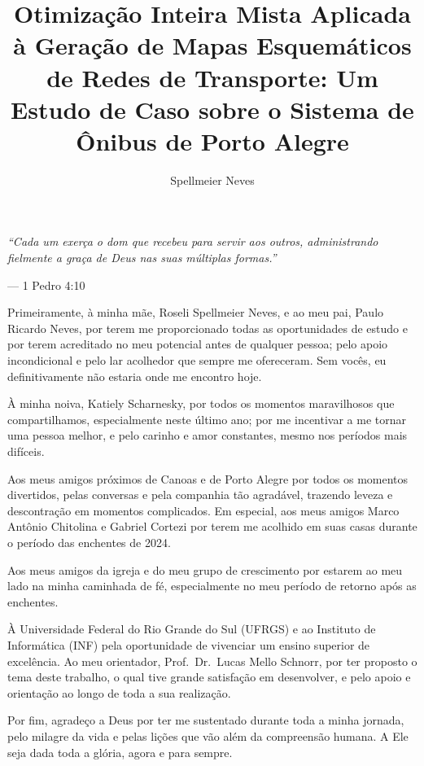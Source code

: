 \documentclass[cic,tc]{infufrgs}
\title{Otimização Inteira Mista Aplicada à Geração de Mapas Esquemáticos de Redes de Transporte: Um Estudo de Caso sobre o Sistema de Ônibus de Porto Alegre}
\author{Spellmeier Neves}{Gustavo}
\begin{document}

\maketitle

\begin{dedicatoria}
  \begin{minipage}{0.7\textwidth}
    \textit{``Cada um exerça o dom que recebeu para servir aos outros, administrando fielmente a graça de Deus nas suas múltiplas formas.''}
    \par\vspace{0.3cm}\hfill --- 1 Pedro 4:10
  \end{minipage}
\end{dedicatoria}

\begin{agradecimentos}
    Primeiramente, à minha mãe, Roseli Spellmeier Neves, e ao meu pai, Paulo Ricardo Neves, por terem me proporcionado todas as oportunidades de estudo e por terem acreditado no meu potencial antes de qualquer pessoa; pelo apoio incondicional e pelo lar acolhedor que sempre me ofereceram. Sem vocês, eu definitivamente não estaria onde me encontro hoje.
    
    À minha noiva, Katiely Scharnesky, por todos os momentos maravilhosos que compartilhamos, especialmente neste último ano; por me incentivar a me tornar uma pessoa melhor, e pelo carinho e amor constantes, mesmo nos períodos mais difíceis.

    Aos meus amigos próximos de Canoas e de Porto Alegre por todos os momentos divertidos, pelas conversas e pela companhia tão agradável, trazendo leveza e descontração em momentos complicados. Em especial, aos meus amigos Marco Antônio Chitolina e Gabriel Cortezi por terem me acolhido em suas casas durante o período das enchentes de 2024.

    Aos meus amigos da igreja e do meu grupo de crescimento por estarem ao meu lado na minha caminhada de fé, especialmente no meu período de retorno após as enchentes.

    À Universidade Federal do Rio Grande do Sul (UFRGS) e ao Instituto de Informática (INF) pela oportunidade de vivenciar um ensino superior de excelência. Ao meu orientador, Prof.~Dr.~Lucas Mello Schnorr, por ter proposto o tema deste trabalho, o qual tive grande satisfação em desenvolver, e pelo apoio e orientação ao longo de toda a sua realização.

    Por fim, agradeço a Deus por ter me sustentado durante toda a minha jornada, pelo milagre da vida e pelas lições que vão além da compreensão humana. A Ele seja dada toda a glória, agora e para sempre.

\end{agradecimentos}
\end{document}
